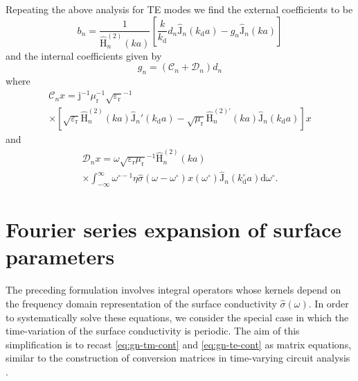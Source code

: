 \documentclass[article]{IEEEtran}
\newcommand{\T}[1]{\mathrm{#1}}
\newcommand{\Jh}{\hat{\T{J}}}
\newcommand{\Hh}{\hat{\T{H}}^{(2)}}
\newcommand{\Hhp}{\hat{\T{H}}^{(2)\prime}}
\begin{document}
Repeating the above analysis for TE modes we find the external coefficients to be
\begin{equation}
    b_n = \frac{1}{\Hh_n(ka)}\left[\frac{k}{k_\T{d}}d_n\Jh_n(k_\T{d}a) - g_n\Jh_n(ka)\right]
    \label{eq:bn-dn}
\end{equation}
and the internal coefficients given by
\begin{equation}
    g_n = (\mathcal{C}_n + \mathcal{D}_n)d_n
    \label{eq:gn-te-cont}
\end{equation}
where
\begin{multline}
    \mathcal{C}_n x = \T{j}^{-1}\mu_\T{r}^{-1}\sqrt{\varepsilon_\T{r}}^{-1}\\\times\left[\sqrt{\varepsilon_\T{r}}\Hh_n(ka)\Jh_n'(k_\T{d}a) -\sqrt{\mu_\T{r}}\Hhp_n(ka)\Jh_n(k_\T{d}a)\right]x
    \label{eq:cnx}
\end{multline}
and
\begin{multline}
    \mathcal{D}_n x = \omega\sqrt{\varepsilon_\T{r}\mu_\T{r}}^{-1}\Hh_n(ka)\\\times\int_{-\infty}^\infty \omega^{\circ-1}\eta\hat{\sigma}(\omega-\omega^\circ)x(\omega^\circ)\Jh_n(k^\circ_\T{d}a) \T{d}\omega^\circ.
\end{multline}




\section{Fourier series expansion of surface parameters}
\label{sec:fourier}

The preceding formulation involves integral operators whose kernels depend on the frequency domain representation of the surface conductivity $\hat{\sigma}(\omega)$.  In order to systematically solve these equations, we consider the special case in which the time-variation of the surface conductivity is periodic.  The aim of this simplification is to recast \eqref{eq:gn-tm-cont} and \eqref{eq:gn-te-cont} as matrix equations, similar to the construction of conversion matrices in time-varying circuit analysis \cite{maas2003nonlinear}.
\end{document}
